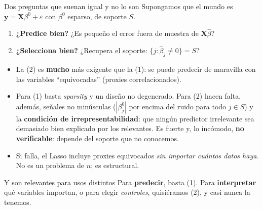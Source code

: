\documentclass{beamer}
\newcommand{\1}{\mathbb{I}}
\begin{document}
\begin{frame}{Dos preguntas que suenan igual y no lo son}
\small
Supongamos que el mundo es $\mathbf{y} = \mathbf{X}\beta^0 + \varepsilon$ con $\beta^0$ esparso, de soporte $S$.
\begin{enumerate}\itemsep5pt
  \item \textbf{¿Predice bien?} ¿Es pequeño el error fuera de muestra de $\mathbf{X}\hat{\beta}$? \pause
  \item \textbf{¿Selecciona bien?} ¿Recupera el soporte: $\{j : \hat{\beta}_j \neq 0\} = S$? \pause
\end{enumerate}
\vspace{0.1cm}
\begin{itemize}\itemsep4pt
  \item La (2) es \textbf{mucho} más exigente que la (1): se puede predecir de maravilla con las variables ``equivocadas'' (proxies correlacionados).
  \item Para (1) basta \emph{sparsity} y un diseño no degenerado. Para (2) hacen falta, además, señales no minúsculas ($|\beta^0_j|$ por encima del ruido para todo $j \in S$) y la \textbf{condición de irrepresentabilidad}: que ningún predictor irrelevante sea demasiado bien explicado por los relevantes. Es fuerte y, lo incómodo, \textbf{no verificable}: depende del soporte que no conocemos. \pause
  \item Si falla, el Lasso incluye proxies equivocados \emph{sin importar cuántos datos haya}. No es un problema de $n$; es estructural.
\end{itemize}
\pause
\begin{block}{Y son relevantes para usos distintos}
Para \textbf{predecir}, basta (1). Para \textbf{interpretar} qué variables importan, o para elegir \emph{controles}, quisiéramos (2), y casi nunca la tenemos.
\end{block}
\end{frame}
\end{document}
